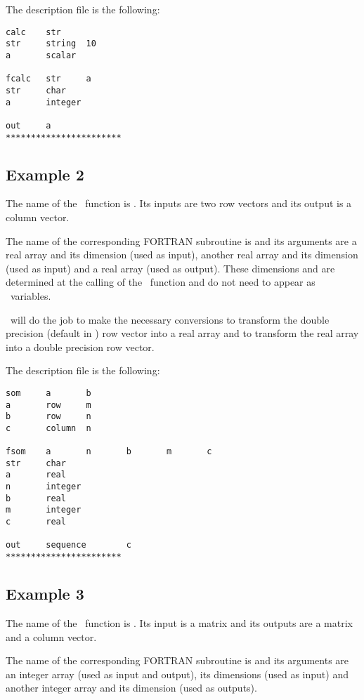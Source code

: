 The description file is the following:
\begin{verbatim}
calc    str
str     string  10
a       scalar

fcalc   str     a
str     char
a       integer

out     a
***********************
\end{verbatim}

\subsection{Example 2}
\label{ex2}

The name of the \SCI\ function is . Its inputs are two row vectors and
its  output is a column vector.

The name of the corresponding FORTRAN subroutine is  and its arguments
are a real array and its dimension (used as input), another 
real array and its dimension (used as input) and a real array (used as output).
These dimensions  and  are determined at the calling of the \SCI\
function and do not need to appear as \SCI\ variables.

\ISCI\ will do the job to make the necessary conversions to transform the
double precision (default in \SCI) row vector \T{a} into a real array and to
transform the real array \T{c} into a double precision row vector.

The description file is the following:
\begin{verbatim}
som     a       b
a       row     m
b       row     n
c       column  n

fsom    a       n       b       m       c
str     char
a       real
n       integer
b       real
m       integer
c       real

out     sequence        c
***********************
\end{verbatim}

\subsection{Example 3}
\label{ex3}

The name of the \SCI\ function is . Its input is a matrix and its
outputs are a matrix and a column vector.

The name of the corresponding FORTRAN subroutine is  and its arguments
are an integer array (used as input and output), its dimensions (used as
input) and another integer array and its dimension (used as outputs).

